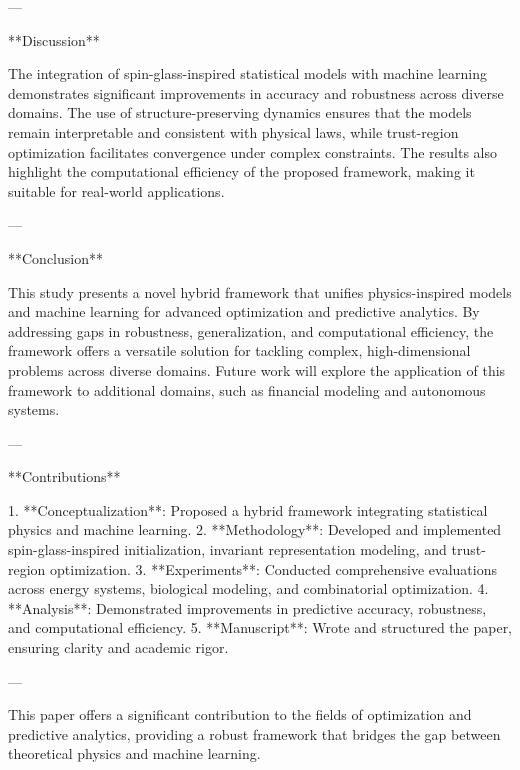 ---

**Discussion**

The integration of spin-glass-inspired statistical models with machine learning demonstrates significant improvements in accuracy and robustness across diverse domains. The use of structure-preserving dynamics ensures that the models remain interpretable and consistent with physical laws, while trust-region optimization facilitates convergence under complex constraints. The results also highlight the computational efficiency of the proposed framework, making it suitable for real-world applications.

---

**Conclusion**

This study presents a novel hybrid framework that unifies physics-inspired models and machine learning for advanced optimization and predictive analytics. By addressing gaps in robustness, generalization, and computational efficiency, the framework offers a versatile solution for tackling complex, high-dimensional problems across diverse domains. Future work will explore the application of this framework to additional domains, such as financial modeling and autonomous systems.

---

**Contributions**

1. **Conceptualization**: Proposed a hybrid framework integrating statistical physics and machine learning.
2. **Methodology**: Developed and implemented spin-glass-inspired initialization, invariant representation modeling, and trust-region optimization.
3. **Experiments**: Conducted comprehensive evaluations across energy systems, biological modeling, and combinatorial optimization.
4. **Analysis**: Demonstrated improvements in predictive accuracy, robustness, and computational efficiency.
5. **Manuscript**: Wrote and structured the paper, ensuring clarity and academic rigor.

--- 

This paper offers a significant contribution to the fields of optimization and predictive analytics, providing a robust framework that bridges the gap between theoretical physics and machine learning.
